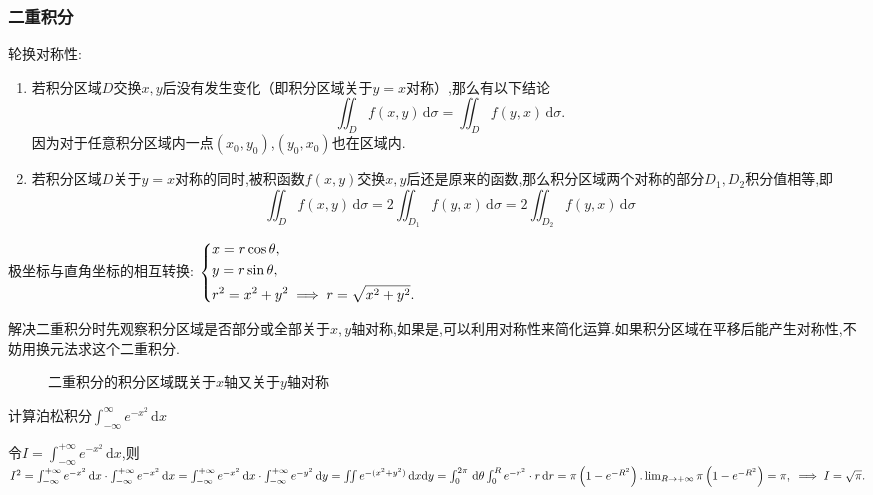 \subsubsection{二重积分}

轮换对称性:
\begin{enumerate}
    \item 若积分区域$D$交换$x,y$后没有发生变化（即积分区域关于$y=x$对称）,那么有以下结论
    \begin{equation*}
        \iint_D f(x,y) \,\mathrm{d}\sigma=\iint_D f(y,x) \,\mathrm{d}\sigma.
    \end{equation*}
    因为对于任意积分区域内一点$(x_0,y_0)$,$(y_0,x_0)$也在区域内.
    \item 若积分区域$D$关于$y=x$对称的同时,被积函数$f(x,y)$交换$x,y$后还是原来的函数,那么积分区域两个对称的部分$D_1,D_2$积分值相等,即
    \begin{equation*}
        \iint_D f(x,y) \,\mathrm{d}\sigma=2\iint_{D_1} f(y,x) \,\mathrm{d}\sigma=2\iint_{D_2} f(y,x) \,\mathrm{d}\sigma
    \end{equation*}
\end{enumerate}


极坐标与直角坐标的相互转换:
$\begin{dcases}
    x=r\cos \theta,\\
    y=r\sin \theta,\\
    r^2=x^2+y^2 \implies r=\sqrt{x^2+y^2}.
\end{dcases}$

解决二重积分时先观察积分区域是否部分或全部关于$x,y$轴对称,如果是,可以利用对称性来简化运算.如果积分区域在平移后能产生对称性,不妨用换元法求这个二重积分.
\begin{figure}[htp]
\centering
    \caption{二重积分的积分区域既关于$x$轴又关于$y$轴对称}
\end{figure}

\begin{examp}{计算泊松积分$\displaystyle \int_{-\infty}^{\infty} e^{-x^2} \,\mathrm{d}x $}
    \par \jie 令$I=\int_{-\infty}^{+\infty} e^{-x^2} \,\mathrm{d}x$,则$I^2=\int_{-\infty}^{+\infty} e^{-x^2} \,\mathrm{d}x\cdot \int_{-\infty}^{+\infty} e^{-x^2} \,\mathrm{d}x=\int_{-\infty}^{+\infty} e^{-x^2} \,\mathrm{d}x\cdot \int_{-\infty}^{+\infty} e^{-y^2} \,\mathrm{d}y=\iint e^{-(x^2+y^2)} \,\mathrm{d}x\mathrm{d}y =\int_{0}^{2\pi}  \,\mathrm{d}\theta \int_{0}^{R} e^{-r^2}\cdot r \,\mathrm{d}r =\pi \left( 1-e^{-R^2} \right).\\
    \lim_{R \to +\infty}\pi \left( 1-e^{-R^2} \right)=\pi,\\
    \implies I=\sqrt{\pi}.$
\end{examp}

